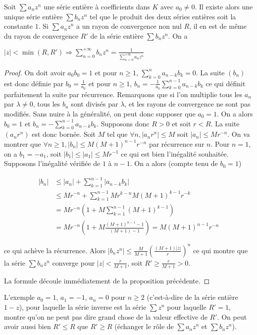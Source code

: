 \begin{prop}
Soit
$\sum a_n z^n$ une série entière à coefficients dans $K$ avec
$a_0 \neq 0$. Il existe alors une unique
série entière $\sum b_n z^n$ tel que le produit des deux séries entières
soit la constante $1$. Si
$\sum a_n z^n$ a un rayon de convergence non nul $R$, il en
est de même du rayon de convergence $R'$ de la série entière
$\sum b_n z^n$. On a

$|z| < \min(R,R') \Rightarrow \sum_{n=0}^{+\infty} b_n z^n = \frac{1}{\sum_{n=0}^{+\infty} a_n z^n}$
\end{prop}

\begin{proof}
On doit avoir $a_0 b_0 = 1$ et pour $n \geq 1$,
$\sum_{k=0}^n a_{n-k} b_k = 0$. La suite
$(b_n)$ est donc définie par $b_0 = \frac{1}{a_0}$ et pour $n \geq 1$, $b_n = -\frac{1}{a_0} \sum_{k=0}^{n-1} a_{n-k} b_k$ ce qui définit
parfaitement la suite par récurrence. Remarquons que si l'on multiplie
tous les $a_n$ par $\lambda \neq 0$, tous les
$b_n$ sont divisés par $\lambda$, et les rayons de convergence ne sont
pas modifiés. Sans nuire à la généralité, on peut donc supposer que
$a_0 = 1$. On a alors $b_0 = 1$ et $b_n = -\sum_{k=0}^{n-1} a_{n-k} b_k$. Supposons donc $R > 0$ et soit $r < R$. La suite
$(a_n r^n)$ est donc bornée. Soit $M$ tel que
$\forall n, |a_n r^n| \leq M$ soit
$|a_n| \leq M r^{-n}$. On va montrer que
$\forall n \geq 1, |b_n| \leq M(M + 1)^{n-1} r^{-n}$ par récurrence sur $n$. Pour $n = 1$,
on a $b_1 = -a_1$, soit $|b_1| \leq |a_1| \leq M r^{-1}$ ce qui est bien
l'inégalité souhaitée. Supposons l'inégalité vérifiée de $1$ à $n - 1$. On a
alors (compte tenu de $b_0 = 1$)

\begin{align*}
|b_n| &\leq |a_n| + \sum_{k=1}^{n-1} |a_{n-k} b_k| \\
&\leq M r^{-n} + \sum_{k=1}^{n-1} M r^{k-n} M(M + 1)^{k-1} r^{-k} \\
&= M r^{-n} \left(1 + M \sum_{k=1}^{n-1} (M + 1)^{k-1}\right) \\
&= M r^{-n} \left(1 + M \frac{(M + 1)^{n-1} - 1}{(M + 1) - 1}\right) = M(M + 1)^{n-1} r^{-n}
\end{align*}

ce qui achève la récurrence. Alors
$|b_n z^n| \leq \frac{M}{M+1} \left(\frac{(M+1)|z|}{r}\right)^n$ ce qui
montre que la série $\sum b_n z^n$ converge pour $|z| < \frac{r}{M+1}$, soit $R' \geq \frac{r}{M+1} > 0$.

La formule découle immédiatement de la proposition précédente.
\end{proof}

\begin{rem}
L'exemple $a_0 = 1$, $a_1 = -1$,
$a_n = 0$ pour $n \geq 2$ (c'est-à-dire de la série entière $1 - z$),
pour laquelle la série inverse est la série
$\sum z^n$
pour laquelle $R' = 1$, montre qu'on ne peut pas dire grand chose de la
valeur effective de $R'$. On peut avoir aussi bien $R' \leq R$ que $R' \geq R$
(échanger le rôle de $\sum a_n z^n$ et
$\sum b_n z^n$).
\end{rem}